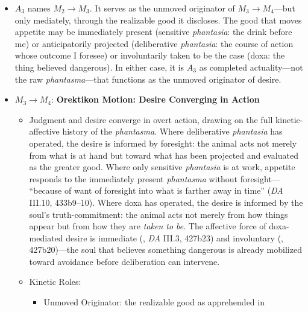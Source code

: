 \begin{itemize}
\begin{itemize}
          \item $A_3$ names $M_2 \rightarrow M_3$. It serves as the unmoved
          originator of $M_3 \rightarrow M_4$---but only mediately, through the
          realizable good it discloses. The good that moves appetite may be
          immediately present (sensitive \textit{phantasia}: the drink before me)
          or anticipatorily projected (deliberative \textit{phantasia}: the
          course of action whose outcome I foresee) or involuntarily taken to be
          the case (doxa: the thing believed dangerous). In either case, it is $A_3$
          as completed actuality---not the raw \textit{phantasma}---that functions
          as the unmoved originator of desire.
          \item $M_3 \rightarrow M_4$: \textbf{Orektikon Motion: Desire Converging
          in Action}
          \begin{itemize}
              \item Judgment and desire converge in overt action, drawing on the
              full kinetic-affective history of the \textit{phantasma}. Where
              deliberative \textit{phantasia} has operated, the desire is informed
              by foresight: the animal acts not merely from what is at hand but
              toward what has been projected and evaluated as the greater good.
              Where only sensitive \textit{phantasia} is at work, appetite responds
              to the immediately present \textit{phantasma} without foresight---
              ``because of want of foresight into what is farther away in time''
              (\textit{DA} III.10, 433b9--10). Where doxa has operated, the
              desire is informed by the soul's truth-commitment: the animal acts
              not merely from how things appear but from how they are
              \textit{taken to be}. The affective force of doxa-mediated desire
              is immediate (, \textit{DA} III.3, 427b23) and
              involuntary (, 427b20)---the soul that believes
              something dangerous is already mobilized toward avoidance before
              deliberation can intervene.
              \item Kinetic Roles:
              \begin{itemize}
                  \item Unmoved Originator: the realizable good as apprehended in

\end{itemize}
\end{itemize}
\end{itemize}
\end{itemize}
